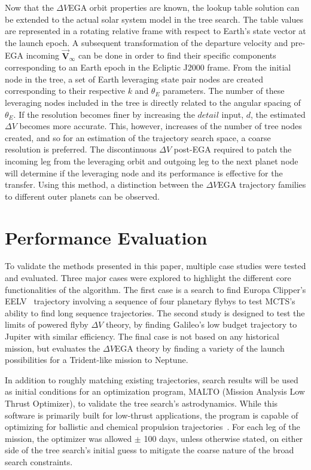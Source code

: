\documentclass[letterpaper, paper,11pt]{AAS}	%
\begin{document}
Now that the $\Delta V$EGA orbit properties are known, the lookup table solution can be extended to the actual solar system model in the tree search. The table values are represented in a rotating relative frame with respect to Earth's state vector at the launch epoch. A subsequent transformation of the departure velocity and pre-EGA incoming $\vec{\textbf{V}}_{\infty}$ can be done in order to find their specific components corresponding to an Earth epoch in the Ecliptic J2000 frame. From the initial node in the tree, a set of Earth leveraging state pair nodes are created corresponding to their respective $k$ and $\theta_E$ parameters. The number of these leveraging nodes included in the tree is directly related to the angular spacing of $\theta_E$. If the resolution becomes finer by increasing the $\textit{detail}$ input, $d$, the estimated $\Delta V$ becomes more accurate. This, however, increases of the number of tree nodes created, and so for an estimation of the trajectory search space, a coarse resolution is preferred. The discontinuous $\Delta V$ post-EGA required to patch the incoming leg from the leveraging orbit and outgoing leg to the next planet node will determine if the leveraging node and its performance is effective for the transfer. Using this method, a distinction between the $\Delta V$EGA trajectory families to different outer planets can be observed.

\section*{Performance Evaluation}

To validate the methods presented in this paper, multiple case studies were tested and evaluated. Three major cases were explored to highlight the different core functionalities of the algorithm. The first case is a search to find Europa Clipper's EELV~\cite{Buffington2014} trajectory involving a sequence of four planetary flybys to test MCTS's ability to find long sequence trajectories. The second study is designed to test the limits of powered flyby $\Delta V$ theory, by finding Galileo's low budget trajectory to Jupiter with similar efficiency. The final case is not based on any historical mission, but evaluates the $\Delta V$EGA theory by finding a variety of the launch possibilities for a Trident-like mission to Neptune.

In addition to roughly matching existing trajectories, search results will be used as initial conditions for an optimization program, MALTO (Mission Analysis Low Thrust Optimizer), to validate the tree search's astrodynamics. While this software is primarily built for low-thrust applications, the program is capable of optimizing for ballistic and chemical propulsion trajectories~\cite{Sims2006}. For each leg of the mission, the optimizer was allowed $\pm$ 100 days, unless otherwise stated, on either side of the tree search's initial guess to mitigate the coarse nature of the broad search constraints.
\end{document}
